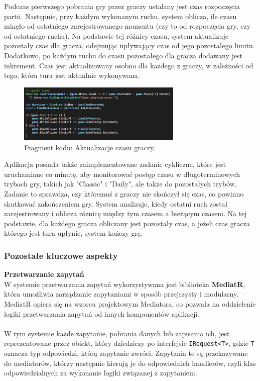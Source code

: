 \documentclass[12pt,a4paper]{article}
\begin{document}
\noindent
Podczas pierwszego pobrania gry przez graczy ustalany jest czas rozpoczęcia partii. Następnie, przy każdym wykonanym ruchu, system oblicza, ile czasu minęło od ostatniego zarejestrowanego momentu (czy to od rozpoczęcia gry, czy od ostatniego ruchu). Na podstawie tej różnicy czasu, system aktualizuje pozostały czas dla gracza, odejmując upływający czas od jego pozostałego limitu. Dodatkowo, po każdym ruchu do czasu pozostałego dla gracza dodawany jest inkrement. Czas jest aktualizowany osobno dla każdego z graczy, w zależności od tego, która tura jest aktualnie wykonywana.

\vspace{0.5cm}
\begin{figure}[h!]
    \centering
    \includegraphics[width=0.7\textwidth]{images/ex_update_times.png}
    \caption{Fragment kodu: Aktualizacje czasu graczy.}
\end{figure}
\vspace{0.5cm}

\noindent
Aplikacja posiada także zaimplementowane zadanie cykliczne, które jest uruchamiane co minutę, aby monitorować postęp czasu w długoterminowych trybach gry, takich jak "Classic" i "Daily", ale także do pozostałych trybów. Zadanie to sprawdza, czy któremuś z graczy nie skończył się czas, co powinno skutkować zakończeniem gry. System analizuje, kiedy ostatni ruch został zarejestrowany i oblicza różnicę między tym czasem a bieżącym czasem. Na tej podstawie, dla każdego gracza obliczany jest pozostały czas, a jeżeli czas gracza którego jest tura upłynie, system kończy grę.

\newpage

\subsubsection{Pozostałe kluczowe aspekty}

\noindent \textbf{Przetwarzanie zapytań}\\
W systemie przetwarzania zapytań wykorzystywana jest biblioteka \textbf{MediatR}, która umożliwia zarządzanie zapytaniami w sposób przejrzysty i modularny. MediatR opiera się na wzorcu projektowym Mediatora, co pozwala na oddzielenie logiki przetwarzania zapytań od innych komponentów aplikacji.
\\\\
W tym systemie każde zapytanie, pobrania danych lub zapisania ich, jest reprezentowane przez obiekt, który dziedziczy po interfejsie \texttt{IRequest<T>}, gdzie \texttt{T} oznacza typ odpowiedzi, którą zapytanie zwróci. Zapytania te są przekazywane do mediatorów, którzy następnie kierują je do odpowiednich handlerów, czyli klas odpowiedzialnych za wykonanie logiki związanej z zapytaniem.
\\\\
\end{document}
